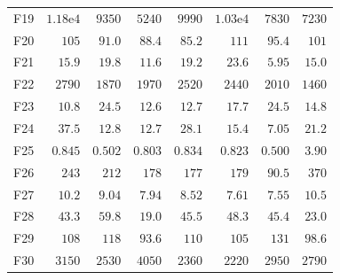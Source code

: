 \begin{tabular}{lrrrrrrr}
F19 & $1.18\mathrm{e}{4}$ & $9350$ & $5240$ & $9990$ & $1.03\mathrm{e}{4}$ & $7830$ & $7230$ \\
F20 & $105$ & $91.0$ & $88.4$ & $85.2$ & $111$ & $95.4$ & $101$ \\
F21 & $15.9$ & $19.8$ & $11.6$ & $19.2$ & $23.6$ & $5.95$ & $15.0$ \\
F22 & $2790$ & $1870$ & $1970$ & $2520$ & $2440$ & $2010$ & $1460$ \\
F23 & $10.8$ & $24.5$ & $12.6$ & $12.7$ & $17.7$ & $24.5$ & $14.8$ \\
F24 & $37.5$ & $12.8$ & $12.7$ & $28.1$ & $15.4$ & $7.05$ & $21.2$ \\
F25 & $0.845$ & $0.502$ & $0.803$ & $0.834$ & $0.823$ & $0.500$ & $3.90$ \\
F26 & $243$ & $212$ & $178$ & $177$ & $179$ & $90.5$ & $370$ \\
F27 & $10.2$ & $9.04$ & $7.94$ & $8.52$ & $7.61$ & $7.55$ & $10.5$ \\
F28 & $43.3$ & $59.8$ & $\mathbf{19.0}$ & $45.5$ & $48.3$ & $45.4$ & $23.0$ \\
F29 & $108$ & $118$ & $93.6$ & $110$ & $105$ & $131$ & $98.6$ \\
F30 & $3150$ & $2530$ & $4050$ & $2360$ & $2220$ & $2950$ & $2790$ \\
\bottomrule
\end{tabular}
